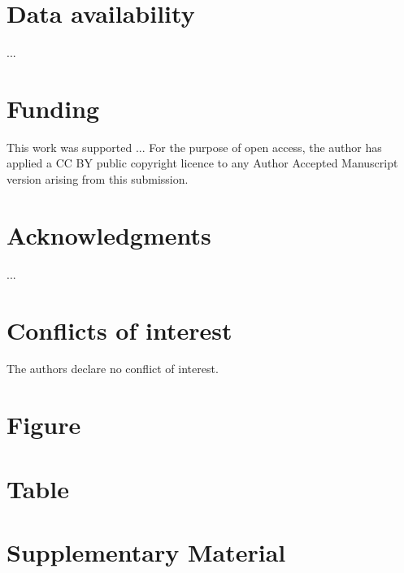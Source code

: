 \documentclass[fleqn,10pt,lineno]{manuscript}
\newcommand{\beginsupplement}{%
        \setcounter{table}{0}
        \renewcommand{\thetable}{S\arabic{table}}%
        \setcounter{figure}{0}
        \renewcommand{\thefigure}{S\arabic{figure}}%
     }
\begin{document}
\section*{Data availability} 
...

\section*{Funding}
This work was supported ... For the purpose of open access, the author has applied a CC BY public copyright licence to any Author Accepted Manuscript version arising from this submission.

\section*{Acknowledgments}
...

\section*{Conflicts of interest}
The authors declare no conflict of interest.





\section*{Figure}


\section*{Table}


\clearpage

\beginsupplement
\renewcommand\figurename{Supplementary Figure}
\renewcommand\tablename{Supplementary Table}


\section*{Supplementary Material}
\end{document}
